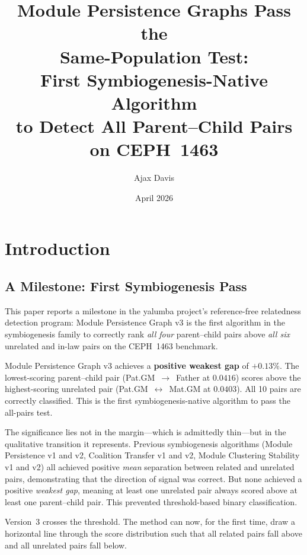 \documentclass{../yalumba}
\title{Module Persistence Graphs Pass the\\Same-Population Test:\\First Symbiogenesis-Native Algorithm\\to Detect All Parent--Child Pairs on CEPH~1463}
\author{Ajax Davis}
\date{April 2026}
\begin{document}
\maketitle

\tableofcontents
\newpage

\section{Introduction}
\label{sec:intro}


\subsection{A Milestone: First Symbiogenesis Pass}

This paper reports a milestone in the yalumba project's reference-free
relatedness detection program: Module Persistence Graph v3 is the first
algorithm in the symbiogenesis family to correctly rank \emph{all four}
parent--child pairs above \emph{all six} unrelated and in-law pairs on the
CEPH~1463 benchmark.

\begin{keyfinding}
Module Persistence Graph v3 achieves a \textbf{positive weakest gap} of
$+0.13\%$.  The lowest-scoring parent--child pair (Pat.GM~$\to$~Father at
$0.0416$) scores above the highest-scoring unrelated pair
(Pat.GM~$\leftrightarrow$~Mat.GM at $0.0403$).  All 10 pairs are correctly
classified.  This is the first symbiogenesis-native algorithm to pass the
all-pairs test.
\end{keyfinding}


The significance lies not in the margin---which is admittedly thin---but in
the qualitative transition it represents.  Previous symbiogenesis algorithms
(Module Persistence v1 and v2, Coalition Transfer v1 and v2, Module Clustering
Stability v1 and v2) all achieved positive \emph{mean} separation between
related and unrelated pairs, demonstrating that the direction of signal was
correct.  But none achieved a positive \emph{weakest gap}, meaning at least
one unrelated pair always scored above at least one parent--child pair.  This
prevented threshold-based binary classification.

Version~3 crosses the threshold.  The method can now, for the first time,
draw a horizontal line through the score distribution such that all related
pairs fall above and all unrelated pairs fall below.
\end{document}
